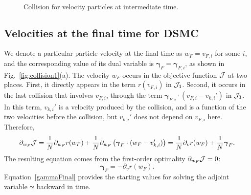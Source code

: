 \documentclass[times,final,nopreprintline]{elsarticle}
\newcommand{\bgamma}{\boldsymbol \gamma}
\begin{document}
\begin{figure}
\begin{center}
\caption{Collision for velocity particles at intermediate time.}~\label{fig:collision2}
\end{center}
\end{figure} 








\subsection{Velocities at  the final time for DSMC} \label{DiscreteFinal}
We denote a particular particle velocity  at the final time as $w_F=v_{{F}, i}$ for some $i$, and the corresponding value of its dual variable is  $\bgamma_F = \bgamma_{{F}, i} $, as shown in Fig.~\ref{fig:collision1}(a). The velocity $w_F$ occurs in the objective function $\mathcal J$ at two places. First, it directly appears in the term $r(v_{{F}, i})$ in $\mathcal J_1$. Second, it occurs in the last collision that involves $v_{{F}, i}$, through the term $\bgamma_{F,i} \cdot (v_{F,i}-v_{k,i}')$ in $\mathcal J_3$. 
In this term,  $v_{k,i}'$ is a velocity produced by the collision, and is a function of the two velocities before the collision, but $v_{k,i}'$ does not depend on $v_{F,i}$ here. Therefore,
\begin{equation*}
\partial_{ w_F } \cJ = \frac{1}{N} \partial_{ w_F } r(w_F ) +\frac{1}{N}  \partial_{ w_F} \left(  \bgamma_{F} \cdot(w_F-v_{k,i}')\right) \nonumber
= \frac{1}{N}\partial_v r(w_F) +\frac{1}{N} \bgamma_{F}.
\end{equation*}
The resulting equation comes from the first-order optimality $\partial_{w_F } \mathcal J=0$:
\begin{equation}
\bgamma_{F} = - \partial_v r(w_F) \label{gammaFinal}.
\end{equation}
Equation~\eqref{gammaFinal} provides the starting values for solving the adjoint variable $\bgamma$ backward in time.
\end{document}
